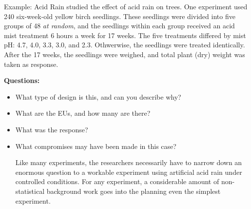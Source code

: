\begin{frame}[allowframebreaks]{Example: Acid Rain}
  \cite{wood74} studied the effect of acid rain on trees. 
  One experiment used 240 six-week-old yellow birch seedlings. These seedlings were divided into five groups of 48 \emph{at random}, and the seedlings within each group received an acid mist treatment 6 hours a week for 17 weeks.
  The five treatments differed by mist pH: 4.7, 4.0, 3.3, 3.0, and 2.3. Othwerwise, the seedlings were treated identically.
  After the 17 weeks, the seedlings were weighed, and total plant (dry) weight was taken as response.
  
  \textbf{Questions:}
  
  \begin{itemize}
    \item What type of design is this, and can you describe why?
    \item What are the EUs, and how many are there?
    \item What was the response?
  
  \framebreak
    \item What compromises may have been made in this case?
    
        
        
        Like many experiments, the researchers necessarily have to narrow down an enormous question to a workable experiment using artificial acid rain under controlled conditions.
        For any experiment, a considerable amount of non-statistical background work goes into the planning even the simplest experiment. 
  
  \end{itemize}
\end{frame}

